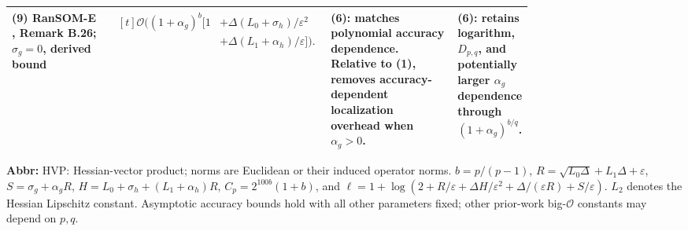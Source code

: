 \begin{table}[tp]
\begin{threeparttable}
\begin{tabularx}{\linewidth}{@{}>{\raggedright\arraybackslash}p{0.20\linewidth}>{\raggedright\arraybackslash}p{0.32\linewidth}>{\raggedright\arraybackslash}p{0.25\linewidth}>{\raggedright\arraybackslash}X@{}}
\midrule
\textbf{(9)} RanSOM-E \citep{gahChaytiFakhouri2026v3}, Remark B.26; $\sigma_g=0$, derived bound
& $\begin{aligned}[t]\mathcal{O}\!\bigl((1+\alpha_g)^b[1
&+\Delta(L_0+\sigma_h)/\varepsilon^2\\
&+\Delta(L_1+\alpha_h)/\varepsilon]\bigr).
\end{aligned}$
& \textbf{(6)}: matches polynomial accuracy dependence. Relative to \textbf{(1)}, removes accuracy-dependent localization overhead when $\alpha_g>0$.
& \textbf{(6)}: retains logarithm, $D_{p,q}$, and potentially larger $\alpha_g$ dependence through $(1+\alpha_g)^{b/q}$. \\
\bottomrule
\end{tabularx}
\begin{tablenotes}[flushleft]\footnotesize
\item[] \textbf{Abbr:} HVP: Hessian-vector product; norms are Euclidean or their induced operator norms. $b=p/(p-1)$, $R=\sqrt{L_0\Delta}+L_1\Delta+\varepsilon$, $S=\sigma_g+\alpha_gR$, $H=L_0+\sigma_h+(L_1+\alpha_h)R$, $C_p=2^{100b}(1+b)$, and $\ell=1+\log(2+R/\varepsilon+\Delta H/\varepsilon^2+\Delta/(\varepsilon R)+S/\varepsilon)$. $L_2$ denotes the Hessian Lipschitz constant. Asymptotic accuracy bounds hold with all other parameters fixed; other prior-work big-$\mathcal{O}$ constants may depend on $p,q$.
\end{tablenotes}
\end{threeparttable}
\end{table}
